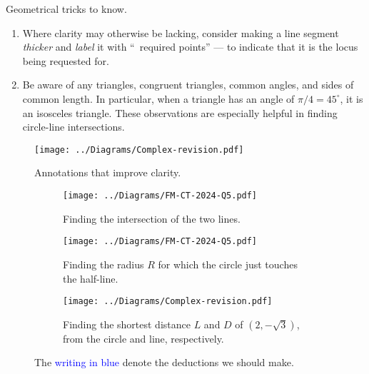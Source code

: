 \documentclass[oneside]{book}
\begin{document}
\begin{note}
  Geometrical tricks to know.
  \begin{enumerate}
    \item Where clarity may otherwise be lacking, consider making a line segment \emph{thicker} and \emph{label} it with ``\textrightarrow\ required points'' --- to indicate that it is the locus being requested for.  
    \item Be aware of any triangles, congruent triangles, common angles, and sides of common length. In particular, when a triangle has an angle of \(\pi/4=45^{\circ}\), it is an isosceles triangle. These observations are especially helpful in finding circle-line intersections.
  \end{enumerate}
\end{note}
\begin{example}{}{}
  \begin{figure}[H]
    \centering
    \texttt{[image: ../Diagrams/Complex-revision.pdf]}
    \caption{\textcolor{green!85!black}{Annotations} that improve clarity.}
    \label{fig:complex-clarity-improvements}
  \end{figure}
  \begin{figure}[H]
    \centering
    \begin{subfigure}[c]{0.45\textwidth}
      \centering
      \texttt{[image: ../Diagrams/FM-CT-2024-Q5.pdf]}
      \caption{Finding the intersection of the two lines.}
  \end{subfigure}\hfill
  \begin{subfigure}[c]{0.45\textwidth}
      \centering
      \texttt{[image: ../Diagrams/FM-CT-2024-Q5.pdf]}
      \caption{Finding the radius \(R\) for which the circle just touches the half-line.}
  \end{subfigure}

  \begin{subfigure}[c]{0.45\textwidth}
    \centering
    \texttt{[image: ../Diagrams/Complex-revision.pdf]}
    \caption{Finding the shortest distance \(L\) and \(D\) of \((2,-\sqrt{3})\), from the circle and line, respectively.}
  \end{subfigure}
    \caption{The \textcolor{blue}{writing in blue} denote the deductions we should make.}
    \label{fig:RVFM-CT-2024-Complex}
  \end{figure}
\end{example}


\end{document}
